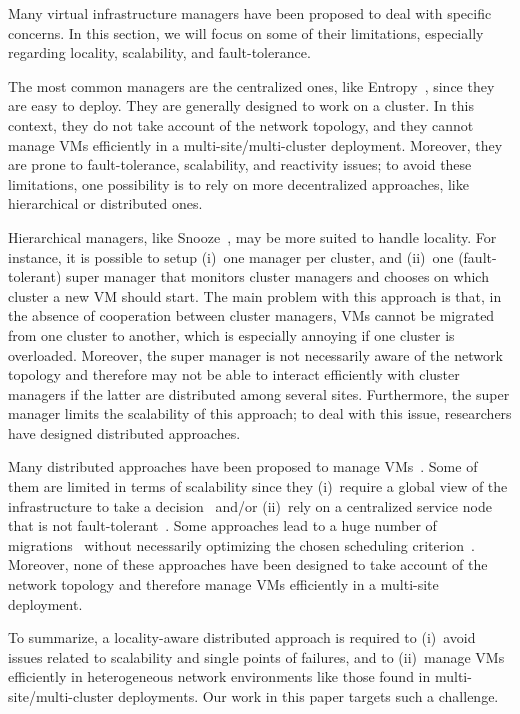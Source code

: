 

Many virtual infrastructure managers have been proposed to deal with specific concerns.
In this section, we will focus on some of their limitations, especially regarding
locality, scalability, and fault-tolerance.

The most common managers are the centralized ones, like
Entropy~\cite{hermenier:cp11,hermenier:2013}, since they are easy to deploy.
%
They are generally designed to work on a cluster.
%
In this context, they do not take account of the network topology, and they
cannot manage VMs efficiently in a multi-site/multi-cluster deployment.
%
Moreover, they are prone to fault-tolerance, scalability, and reactivity issues; to avoid
these limitations, one possibility is to rely on more decentralized approaches, like
hierarchical or distributed ones.

Hierarchical managers, like Snooze~\cite{feller:ccgrid12}, may be more suited to handle
locality.
%
For instance, it is possible to setup (i)~one manager per cluster, and (ii)~one
(fault-tolerant) super manager that monitors cluster managers and chooses on which cluster
a new VM should start.
%
%
The main problem with this approach is that, in the absence of cooperation between cluster
managers, VMs cannot be migrated from one cluster to another, which is especially annoying
if one cluster is overloaded.
%
Moreover, the super manager is not necessarily aware of the network topology and therefore
may not be able to interact efficiently with cluster managers if the latter are
distributed among several sites.
%
Furthermore, the super manager limits the scalability of this approach; to deal with this
issue, researchers have designed distributed approaches.

Many distributed approaches have been proposed to manage
VMs~\cite{barbagallo:lncs10,feller:cloudcom12,marzolla:wowmom11,mastroianni:europar11,rouzaudcornabas:vhpc10,yazir:cloud10}.
%
Some of them are limited in terms of scalability since they (i)~require a global view of
the infrastructure to take a decision~\cite{rouzaudcornabas:vhpc10,yazir:cloud10} and/or
(ii)~rely on a centralized service node that is not
fault-tolerant~\cite{mastroianni:europar11,yazir:cloud10}.
%
Some approaches lead to a huge number of
migrations~\cite{barbagallo:lncs10,mastroianni:europar11} without necessarily optimizing
the chosen scheduling criterion~\cite{barbagallo:lncs10}.
%
Moreover, none of these approaches have been designed to take account of the network
topology and therefore manage VMs efficiently in a multi-site deployment.

To summarize, a locality-aware distributed approach is required to (i)~avoid issues
related to scalability and single points of failures, and to (ii)~manage VMs efficiently
in heterogeneous network environments like those found in multi-site/multi-cluster deployments.
Our work in this paper targets such a challenge. 
